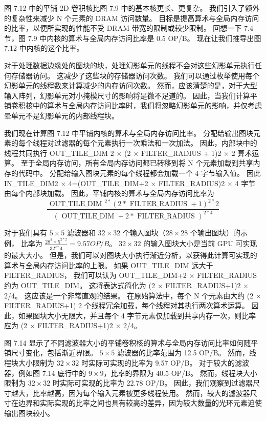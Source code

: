 图 7.12 中的平铺 2D 卷积核比图 7.9 中的基本核更长、更复杂。 我们引入了额外的复杂性来减少 N 个元素的 DRAM 访问数量。 
目标是提高算术与全局内存访问的比率，以便所实现的性能不受 DRAM 带宽的限制或较少限制。 
回想一下 7.4 节，图 7.9 中内核的算术与全局内存访问比率是 0.5 OP/B。 现在让我们推导出图 7.12 中内核的这个比率。

对于处理数据边缘处的图块的块，处理幻影单元的线程不会对这些幻影单元执行任何存储器访问。 这减少了这些块的存储器访问次数。 
我们可以通过枚举使用每个幻影单元的线程数来计算减少的内存访问次数。 
然而，应该清楚的是，对于大型输入阵列，幻影单元对小掩模尺寸的影响将是微不足道的。 
因此，当我们计算平铺卷积核中的算术与全局内存访问比率时，我们将忽略幻影单元的影响，并仅考虑晕单元不是幻影单元的内部线程块。

我们现在计算图 7.12 中平铺内核的算术与全局内存访问比率。 
分配给输出图块元素的每个线程对过滤器的每个元素执行一次乘法和一次加法。 
因此，内部块中的线程共同执行 OUT\_TILE\_DIM 2 × (2 × FILTER\_RADIUS + 1)2 × 2 算术运算。 
至于全局内存访问，所有全局内存访问都已转移到将 N 个元素加载到共享内存的代码中。 
分配给输入图块元素的每个线程都会加载一个 4 字节输入值。 
因此 IN\_TILE\_DIM2 × 4=(OUT\_TILE\_DIM+2 × FILTER\_RADIUS)2 × 4 字节由每个内部块加载。 
因此，平铺内核的算术与全局内存访问比率为
\begin{equation*}
\frac{\text { OUT\_TILE\_DIM }^{2 *}(2 * \text { FILTER\_RADIUS }+1)^{2 *} 2}{(\text { OUT\_TILE\_DIM }+2 * \text { FILTER\_RADIUS })^{2 * 4}}
\end{equation*}

对于我们具有 $5 \times 5$ 滤波器和 $32 \times 32$ 个输入图块（$28 \times 28$ 个输出图块）的示例，
比率为 $\frac{28^{2} \times 5^{2 * 2}}{32^{2 *} 4}=9.57 O P / B$。 
$32 \times 32$ 的输入图块大小是当前 GPU 可实现的最大大小。 
但是，我们可以对图块大小执行渐近分析，以获得此计算可实现的算术与全局内存访问比率的上限。 
如果 OUT\_TILE\_DIM 远大于 FILTER\_RADIUS，
我们可以认为 OUT\_TILE\_DIM+2 × FILTER\_RADIUS 约为 OUT\_TILE\_DIM。 
这将表达式简化为 (2 × FILTER\_RADIUS+1)2 × 2/4。 这应该是一个非常直观的结果。 
在原始算法中，每个 N 个元素由大约 (2 × FILTER\_RADIUS+1) 2 个线程冗余加载，每个线程对其执行两次算术运算。 
因此，如果图块大小无限大，并且每个 4 字节元素仅加载到共享内存一次，则比率应为 (2 × FILTER\_RADIUS+1)2 × 2/4。

图 7.14 显示了不同滤波器大小的平铺卷积核的算术与全局内存访问比率如何随平铺尺寸变化，包括渐近界限。 
$5 \times 5$ 滤波器的比率范围为 12.5 OP/B。 然而，线程块大小限制为 $32 \times 32$ 时实际可实现的比率为 9.57 OP/B。 
对于较大的滤波器，例如图 7.14 底行中的 $9 \times 9$，比率的界限为 40.5 OP/B。 
然而，线程块大小限制为 $32 \times 32$ 时实际可实现的比率为 22.78 OP/B。 
因此，我们观察到过滤器尺寸越大，比率越高，因为每个输入元素被更多线程使用。 
然而，较大的滤波器尺寸在边界和实际实现的比率之间也具有较高的差异，因为较大数量的光环元素迫使输出图块较小。

